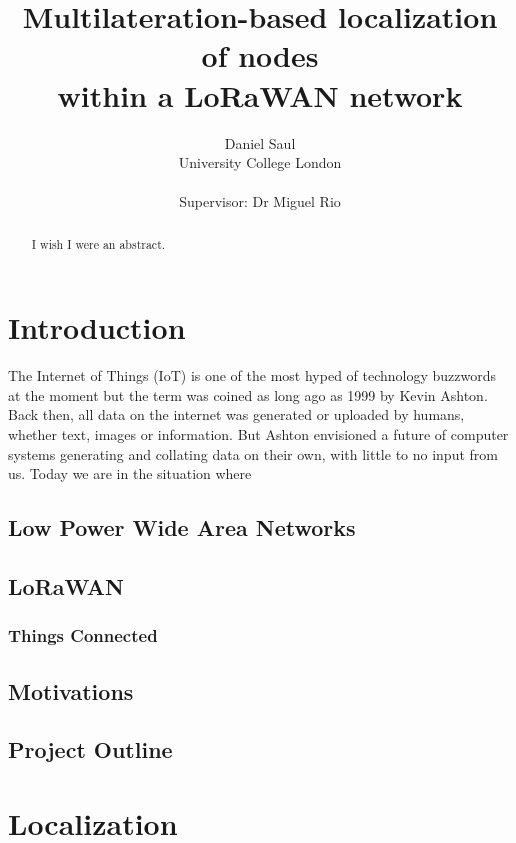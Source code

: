 \documentclass[a4paper]{report}
\title{Multilateration-based localization of nodes\\within a LoRaWAN network}
\author{Daniel Saul\\University College London\\ \\Supervisor: Dr Miguel Rio}
\begin{document}
    \maketitle

\pagestyle{fancy}

\begin{abstract}
    I wish I were an abstract.
\end{abstract}

\tableofcontents


\chapter{Introduction}

  The Internet of Things (IoT) is one of the most hyped of technology buzzwords at the moment but the term was coined as long ago as 1999 by Kevin Ashton. Back then, all data on the internet was generated or uploaded by humans, whether text, images or information. But Ashton envisioned a future of computer systems generating and collating data on their own, with little to no input from us. Today we are in the situation where

  \section{Low Power Wide Area Networks}

  \section{LoRaWAN}
    \subsection{Things Connected}



  \section{Motivations}

  \section{Project Outline}

\chapter{Localization}
\end{document}
